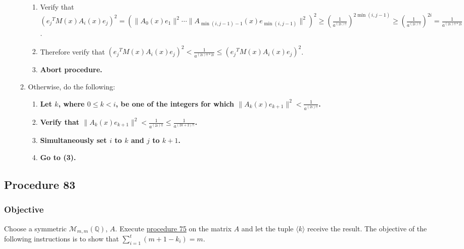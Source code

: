 \documentclass[twocolumn]{article}
\begin{document}
\begin{enumerate}
\begin{enumerate}
						\begin{enumerate}
							\item Verify that $({e_j}^TM(x)A_i(x)e_j)^2=(\lVert A_0(x)e_1\rVert^2\cdots\allowbreak\lVert A_{\min(i,j-1)-1}(x)e_{\min(i,j-1)}\rVert^2)^2\ge(\frac{1}{a^{(2i)!!}})^{2\min(i,j-1)}\ge(\frac{1}{a^{(2i)!!}})^{2i}=\frac{1}{a^{(2i)!!*2i}}$.
							\item Therefore verify that $({e_j}^TM(x)A_i(x)e_j)^2<\frac{1}{a^{(2i)!!*2i}}\le ({e_j}^TM(x)A_i(x)e_j)^2$.
							\item \textbf{Abort procedure.}
						\end{enumerate}
						\item Otherwise, do the following:
						\begin{enumerate}
							\item \textbf{Let $k$, where $0\le k<i$, be one of the integers for which $\lVert A_k(x)e_{k+1}\rVert^2<\frac{1}{a^{(2i)!!}}$.}
							\item \textbf{Verify that $\lVert A_k(x)e_{k+1}\rVert^2<\frac{1}{a^{(2i)!!}}\le\frac{1}{a^{(2k+2)!!}}$.}
							\item \textbf{Simultaneously set $i$ to $k$ and $j$ to $k+1$.}
							\item \textbf{Go to (3).}
						\end{enumerate}
					\end{enumerate}
				\end{enumerate}
		\subsection{Procedure 83}\label{sec:procedure 83}
			\subsubsection{Objective}
				Choose a symmetric $\mathcal{M}_{m,m}(\mathbb{Q})$, $A$. Execute \hyperref[sec:procedure 75]{procedure 75} on the matrix $A$ and let the tuple $\langle k\rangle$ receive the result. The objective of the following instructions is to show that $\sum_{i=1}^t(m+1-k_i)=m$.
\end{document}
